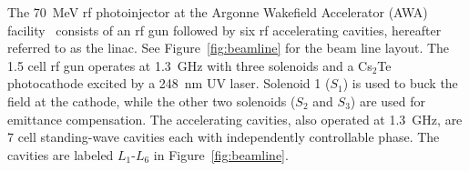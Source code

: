 \documentclass{iitthesis}
\begin{document}
 \label{sec:pareto}
The \SI{70}{MeV} rf photoinjector at the Argonne Wakefield 
Accelerator (AWA) facility~\cite{manoel} 
consists of an rf gun followed by six rf accelerating cavities, 
hereafter referred to as the linac. 
See Figure~\ref{fig:beamline} for the beam line layout. 
The 1.5 cell rf gun operates at \SI{1.3}{GHz} with three solenoids 
and a Cs$_{2}$Te photocathode excited by a \SI{248}{nm} UV laser.  
Solenoid 1 ($S_1$) is used to buck the field at the cathode,
while the other two solenoids ($S_2$ and $S_3$) are used for emittance compensation.  
The accelerating cavities, also operated at \SI{1.3}{GHz}, are 7 cell standing-wave 
cavities \cite{Power:2010zza} each with independently controllable phase. 
The cavities are labeled $L_1$-$L_6$ in Figure~\ref{fig:beamline}. 
\def \gunleft {-1.0}
\def \gunright {0.3}
\def \loneright {1.0}
\def \ltworight {3.5}
\def \lthreeright {5.0}
\def \lfourright {7.0}
\def \lfiveright {8.5}
\def \lsixright {10}
\end{document}
